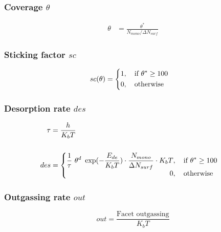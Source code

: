 \subsubsection*{Coverage $\theta$}
\begin{equation}
	\label{eq:cov}
	\begin{split}
		\theta&=\frac{\theta^*}{N_{mono}/\Delta N_{surf}}
	\end{split}
\end{equation}

\subsubsection*{Sticking factor $sc$}
\begin{equation}
	\label{eq:sc}
	sc(\theta)=
	\begin{cases}
		\begin{split}
		1&, \text{\quad if}\ \theta^* \geq 100\\
		0&,  \text{\quad otherwise}
		\end{split}
	\end{cases}
\end{equation}

\subsubsection*{Desorption rate $des$}
\begin{equation}
	\label{eq:des}
	\begin{split}
	\tau&=\frac{h}{K_b T}\\
	&\\
	des&=
	\begin{cases}
		\begin{split}
		\frac{1}{\tau}\ \theta^d\ \exp({-\frac{E_{de}}{K_b T}})\cdot \frac{N_{mono}}{\Delta N_{surf}}\cdot K_b T&, \text{\quad if}\ \theta^* \geq 100\\
		0&,  \text{\quad otherwise}
		\end{split}
	\end{cases}
	\end{split}
\end{equation}

\subsubsection*{Outgassing rate $out$}
\begin{equation}
	\label{eq:out}
	out=\frac{\text{Facet outgassing}}{K_b T}
\end{equation}

